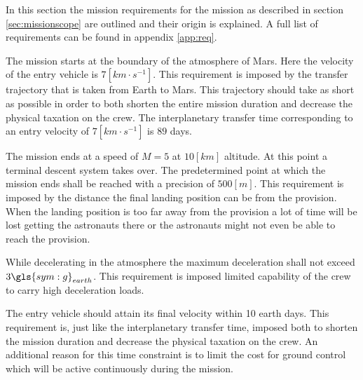 In this section the mission requirements for the mission as described in section \ref{sec:missionscope} are outlined and their origin is explained. A full list of requirements can be found in appendix \ref{app:req}.

The mission starts at the boundary of the atmosphere of Mars. Here the velocity of the entry vehicle is $7 \left[km \cdot s^{-1} \right]$. This requirement is imposed by the transfer trajectory that is taken from Earth to Mars. This trajectory should take as short as possible in order to both shorten the entire mission duration and decrease the physical taxation on the crew. The interplanetary transfer time corresponding to an entry velocity of $7 \left[km \cdot s^{-1} \right]$ is $89$ days. 

The mission ends at a speed of $M=5$ at $10 \left[km\right]$ altitude. At this point a terminal descent system takes over. The predetermined point at which the mission ends shall be reached with a precision of $500 \left[m\right]$. This requirement is imposed by the distance the final landing position can be from the provision. When the landing position is too far away from the provision a lot of time will be lost getting the astronauts there or the astronauts might not even be able to reach the provision.

While decelerating in the atmosphere the maximum deceleration shall not exceed $3\gls{sym:g}_{earth}$. This requirement is imposed limited capability of the crew to carry high deceleration loads.

The entry vehicle should attain its final velocity within 10 earth days. This requirement is, just like the interplanetary transfer time, imposed both to shorten the mission duration and decrease the physical taxation on the crew. An additional reason for this time constraint is to limit the cost for ground control which will be active continuously during the mission.



